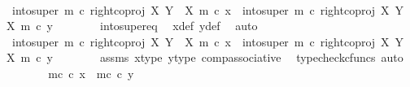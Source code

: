 \begin{isabellebody}
\isanewline
\ \ \ \ \isamarkupfalse%
\ {\isachardoublequoteopen}into{\isacharunderscore}{\kern0pt}super\ m\ {\isasymcirc}\isactrlsub c\ right{\isacharunderscore}{\kern0pt}coproj\ X\ {\isacharparenleft}{\kern0pt}Y\ {\isasymsetminus}\ {\isacharparenleft}{\kern0pt}X{\isacharcomma}{\kern0pt}\ m{\isacharparenright}{\kern0pt}{\isacharparenright}{\kern0pt}\ {\isasymcirc}\isactrlsub c\ x{\isacharprime}{\kern0pt}\ {\isacharequal}{\kern0pt}\ into{\isacharunderscore}{\kern0pt}super\ m\ {\isasymcirc}\isactrlsub c\ right{\isacharunderscore}{\kern0pt}coproj\ X\ {\isacharparenleft}{\kern0pt}Y\ {\isasymsetminus}\ {\isacharparenleft}{\kern0pt}X{\isacharcomma}{\kern0pt}\ m{\isacharparenright}{\kern0pt}{\isacharparenright}{\kern0pt}\ {\isasymcirc}\isactrlsub c\ y{\isacharprime}{\kern0pt}{\isachardoublequoteclose}\isanewline
\ \ \ \ \ \ \isamarkupfalse%
\ into{\isacharunderscore}{\kern0pt}super{\isacharunderscore}{\kern0pt}eq\ \isamarkupfalse%
\ x{\isacharunderscore}{\kern0pt}def\ y{\isacharunderscore}{\kern0pt}def\ \isamarkupfalse%
\ auto\isanewline
\ \ \ \ \isamarkupfalse%
\ \isamarkupfalse%
\ {\isachardoublequoteopen}{\isacharparenleft}{\kern0pt}into{\isacharunderscore}{\kern0pt}super\ m\ {\isasymcirc}\isactrlsub c\ right{\isacharunderscore}{\kern0pt}coproj\ X\ {\isacharparenleft}{\kern0pt}Y\ {\isasymsetminus}\ {\isacharparenleft}{\kern0pt}X{\isacharcomma}{\kern0pt}\ m{\isacharparenright}{\kern0pt}{\isacharparenright}{\kern0pt}{\isacharparenright}{\kern0pt}\ {\isasymcirc}\isactrlsub c\ x{\isacharprime}{\kern0pt}\ {\isacharequal}{\kern0pt}\ {\isacharparenleft}{\kern0pt}into{\isacharunderscore}{\kern0pt}super\ m\ {\isasymcirc}\isactrlsub c\ right{\isacharunderscore}{\kern0pt}coproj\ X\ {\isacharparenleft}{\kern0pt}Y\ {\isasymsetminus}\ {\isacharparenleft}{\kern0pt}X{\isacharcomma}{\kern0pt}\ m{\isacharparenright}{\kern0pt}{\isacharparenright}{\kern0pt}{\isacharparenright}{\kern0pt}\ {\isasymcirc}\isactrlsub c\ y{\isacharprime}{\kern0pt}{\isachardoublequoteclose}\isanewline
\ \ \ \ \ \ \isamarkupfalse%
\ assms\ x{\isacharprime}{\kern0pt}{\isacharunderscore}{\kern0pt}type\ y{\isacharprime}{\kern0pt}{\isacharunderscore}{\kern0pt}type\ comp{\isacharunderscore}{\kern0pt}associative{}\ \isamarkupfalse%
\ {\isacharparenleft}{\kern0pt}typecheck{\isacharunderscore}{\kern0pt}cfuncs{\isacharcomma}{\kern0pt}\ auto{\isacharparenright}{\kern0pt}\isanewline
\ \ \ \ \isamarkupfalse%
\ \isamarkupfalse%
\ {\isachardoublequoteopen}m\isactrlsup c\ {\isasymcirc}\isactrlsub c\ x{\isacharprime}{\kern0pt}\ {\isacharequal}{\kern0pt}\ m\isactrlsup c\ {\isasymcirc}\isactrlsub c\ y{\isacharprime}{\kern0pt}{\isachardoublequoteclose}\isanewline

\end{isabellebody}
